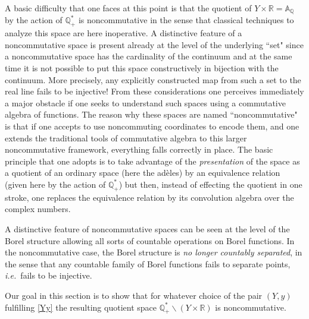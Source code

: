 \documentclass[graybox, envcountsect%
]{svmult}
\def\A{{\mathbb A}}
\def\Q{{\mathbb Q}}
\def\R{{\mathbb R}}
\newcommand{\ie}{{\it i.e.\/}\ }
\def\no{\noindent}
\begin{document}
\no A basic difficulty that one faces at this point is that the quotient of $Y\times \R=\A_\Q$ by the  action of $\Q^*_+$ is noncommutative  in the sense that classical techniques to analyze this space are here inoperative. A distinctive feature  of a noncommutative space is present  already at the level of the underlying ``set" since  a noncommutative space has the cardinality of  the continuum and at the same time it is not possible to put this space constructively in bijection with the continuum. More precisely, any explicitly constructed map from such a set to the real line fails to be injective! From these considerations one perceives immediately a major obstacle if one seeks to understand such spaces using a commutative algebra of functions. The reason why these spaces are named  ``noncommutative" is that if one accepts to use noncommuting coordinates to encode them, and one extends the traditional tools of commutative algebra to this larger noncommutative framework, everything falls correctly in place. The basic principle that one adopts is to take advantage of the  \emph{presentation} of the space as a quotient of an ordinary space (here the ad\`eles) by an equivalence relation (given here by the action of $\Q_+^*$) but then, instead of effecting the quotient in one stroke, one replaces  the equivalence relation by its convolution algebra over the complex numbers. 

\no A distinctive feature of noncommutative spaces can be seen at the level of the Borel structure allowing all sorts of countable operations on Borel functions. In the noncommutative case, the Borel structure is {\em no longer  countably separated}, in the sense that any countable family of Borel functions fails to separate points, \ie fails to be injective.  

\no Our goal in this section is to show that for whatever choice of the pair $(Y,y)$ fulfilling 
\eqref{Yy} the resulting quotient space $\Q^*_+\backslash (Y\times \R)$ is noncommutative. 
\end{document}
